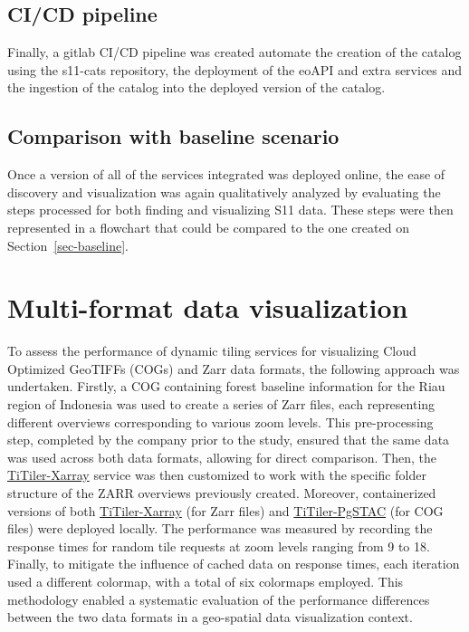 \documentclass[
  oneside,
  open=any]{scrbook}
\begin{document}
\subsection{CI/CD pipeline}\label{cicd-pipeline}

Finally, a gitlab CI/CD pipeline was created automate the creation of
the catalog using the s11-cats repository, the deployment of the eoAPI
and extra services and the ingestion of the catalog into the deployed
version of the catalog.

\subsection{Comparison with baseline
scenario}\label{comparison-with-baseline-scenario}

Once a version of all of the services integrated was deployed online,
the ease of discovery and visualization was again qualitatively analyzed
by evaluating the steps processed for both finding and visualizing S11
data. These steps were then represented in a flowchart that could be
compared to the one created on Section~\ref{sec-baseline}.

\section{Multi-format data
visualization}\label{multi-format-data-visualization}

To assess the performance of dynamic tiling services for visualizing
Cloud Optimized GeoTIFFs (COGs) and Zarr data formats, the following
approach was undertaken. Firstly, a COG containing forest baseline
information for the Riau region of Indonesia was used to create a series
of Zarr files, each representing different overviews corresponding to
various zoom levels. This pre-processing step, completed by the company
prior to the study, ensured that the same data was used across both data
formats, allowing for direct comparison. Then, the
\href{https://github.com/developmentseed/titiler-xarray}{TiTiler-Xarray}
service was then customized to work with the specific folder structure
of the ZARR overviews previously created. Moreover, containerized
versions of both
\href{https://github.com/developmentseed/titiler-xarray}{TiTiler-Xarray}
(for Zarr files) and
\href{https://github.com/stac-utils/titiler-pgstac}{TiTiler-PgSTAC} (for
COG files) were deployed locally. The performance was measured by
recording the response times for random tile requests at zoom levels
ranging from 9 to 18. Finally, to mitigate the influence of cached data
on response times, each iteration used a different colormap, with a
total of six colormaps employed. This methodology enabled a systematic
evaluation of the performance differences between the two data formats
in a geo-spatial data visualization context.
\end{document}
